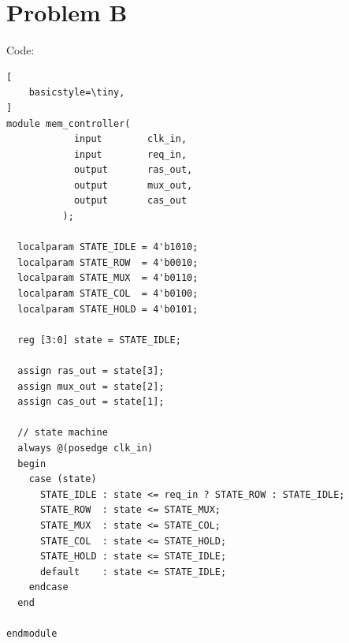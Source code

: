 \documentclass[12pt]{article}
\begin{document}
\section{Problem B}
Code:
\begin{lstlisting}[
    basicstyle=\tiny,
]
module mem_controller(
            input        clk_in,
            input        req_in,
            output       ras_out,
            output       mux_out,
            output       cas_out
          );

  localparam STATE_IDLE = 4'b1010;
  localparam STATE_ROW  = 4'b0010;
  localparam STATE_MUX  = 4'b0110;
  localparam STATE_COL  = 4'b0100;
  localparam STATE_HOLD = 4'b0101;

  reg [3:0] state = STATE_IDLE;

  assign ras_out = state[3];
  assign mux_out = state[2];
  assign cas_out = state[1];

  // state machine
  always @(posedge clk_in)
  begin
    case (state)
      STATE_IDLE : state <= req_in ? STATE_ROW : STATE_IDLE;
      STATE_ROW  : state <= STATE_MUX;
      STATE_MUX  : state <= STATE_COL;
      STATE_COL  : state <= STATE_HOLD;
      STATE_HOLD : state <= STATE_IDLE;
      default    : state <= STATE_IDLE;
    endcase
  end

endmodule
\end{lstlisting}
\end{document}
